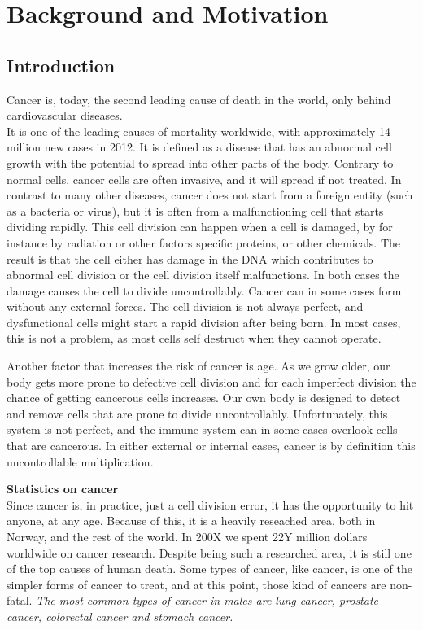 \section{Background and Motivation}

\subsection{Introduction}
Cancer is, today, the second leading cause of death in the world, only behind cardiovascular diseases.\\  %
It is one of the leading causes of mortality worldwide, with approximately 14 million new cases in 2012.\cite{WHOCANCER}
It is defined as a disease that has an abnormal cell growth with the potential to spread into other parts of the body.\cite{WhatIsCancer}
Contrary to normal cells, cancer cells are often invasive, and it will spread if not treated. 
In contrast to many other diseases, cancer does not start from a foreign entity (such as a bacteria or virus), but it is often from a malfunctioning cell that starts dividing rapidly. 
This cell division can happen when a cell is damaged, by for instance by radiation or other factors specific proteins, or other chemicals. The result is that the cell either has damage in the DNA which contributes to abnormal cell division or the cell division itself malfunctions. In both cases the damage causes the cell to divide uncontrollably. 
Cancer can in some cases form without any external forces. The cell division is not always perfect, and dysfunctional cells might start a rapid division after being born. In most cases, this is not a problem, as most cells self destruct when they cannot operate. 

Another factor that increases the risk of cancer is age. As we grow older, our body gets more prone to defective cell division and for each imperfect division the chance of getting cancerous cells increases.  
Our own body is designed to detect and remove cells that are prone to divide uncontrollably. Unfortunately, this system is not perfect, and the immune system can in some cases overlook cells that are cancerous.
In either external or internal cases, cancer is by definition this uncontrollable multiplication.




\textbf{Statistics on cancer}\\
Since cancer is, in practice, just a cell division error, it has the opportunity to hit anyone, at any age. Because of this, it is a heavily reseached area, both in Norway, and the rest of the world.
In 200X we spent 22Y million dollars worldwide on cancer research. 
Despite being such a researched area, it is still one of the top causes of human death. 
Some types of cancer, like \todo{} cancer, is one of the simpler forms of cancer to treat, and at this point, those kind of cancers are non-fatal. 
\textit{The most common types of cancer in males are lung cancer, prostate cancer, colorectal cancer and stomach cancer.\cite{stewart2014world}}
    
